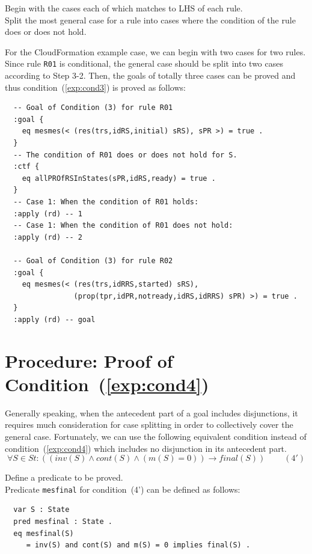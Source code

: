 \documentclass[12pt]{report}
\newcommand{\ra}{\rightarrow}
\begin{document}
\vspace{0.3cm}
 Begin with the cases each of which matches to
LHS of each rule. \\ 
 Split the most general case for a rule into
cases where the condition of the rule does or does not hold. 

For the CloudFormation example case, we can begin with two cases for
two rules. Since rule {\tt R01} is conditional, the general case
should be split into two cases according to Step 3-2. Then, the goals
of totally three cases can be proved and thus
condition~(\ref{exp:cond3}) is proved as follows:
\begin{verbatim}
  -- Goal of Condition (3) for rule R01
  :goal {
    eq mesmes(< (res(trs,idRS,initial) sRS), sPR >) = true .
  }
  -- The condition of R01 does or does not hold for S.
  :ctf {
    eq allPROfRSInStates(sPR,idRS,ready) = true .
  }
  -- Case 1: When the condition of R01 holds:
  :apply (rd) -- 1
  -- Case 1: When the condition of R01 does not hold:
  :apply (rd) -- 2

  -- Goal of Condition (3) for rule R02
  :goal {
    eq mesmes(< (res(trs,idRRS,started) sRS),
                (prop(tpr,idPR,notready,idRS,idRRS) sPR) >) = true .
  }
  :apply (rd) -- goal

\end{verbatim}

\section{Procedure: Proof of Condition~(\ref{exp:cond4})}
\label{sec:mesfinal}
Generally speaking, when the antecedent part of a goal includes
disjunctions, it requires much consideration for case splitting in
order to collectively cover the general case. Fortunately, we can use
the following equivalent condition instead of
condition~(\ref{exp:cond4}) which includes no disjunction in its
antecedent part.
\[\forall S\in St:((inv(S)\land cont(S)\land(m(S) = 0))
  \ra final(S))~~~~~~~~~~(4')\]

\vspace{0.3cm}
 Define a predicate to be proved. \\ Predicate
         {\tt mesfinal} for condition~(4') can be defined as follows:
\begin{verbatim}
  var S : State
  pred mesfinal : State .
  eq mesfinal(S)
     = inv(S) and cont(S) and m(S) = 0 implies final(S) .
\end{verbatim}
\end{document}
